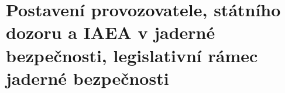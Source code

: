 \section[Legislativa jaderné bezpečnosti]{Postavení provozovatele, státního dozoru a IAEA v jaderné bezpečnosti, legislativní rámec jaderné bezpečnosti}